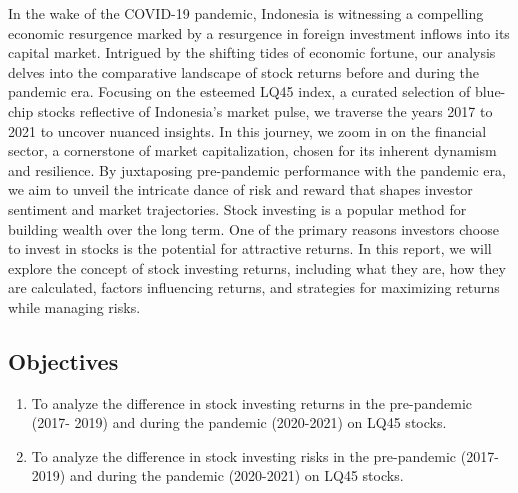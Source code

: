 \par

In the wake of the COVID-19 pandemic, Indonesia is witnessing a compelling economic resurgence marked by a resurgence in foreign investment inflows into its capital market.
Intrigued by the shifting tides of economic fortune, our analysis delves into the comparative landscape of stock returns before and during the pandemic era. Focusing on the esteemed LQ45 index, a curated selection of blue-chip stocks reflective of Indonesia's market pulse, we traverse the years 2017 to 2021 to uncover nuanced insights.
In this journey, we zoom in on the financial sector, a cornerstone of market capitalization, chosen for its inherent dynamism and resilience. By juxtaposing pre-pandemic performance with the pandemic era, we aim to unveil the intricate dance of risk and reward that shapes investor sentiment and market trajectories.
Stock investing is a popular method for building wealth over the long term. One of the primary reasons investors choose to invest in stocks is the potential for attractive returns. In this report, we will explore the concept of stock investing returns, including what they are, how they are calculated, factors influencing returns, and strategies for maximizing returns while managing risks.

\subsection{Objectives}
\begin{enumerate}
    \item To analyze the difference in stock investing returns in the pre-pandemic (2017-
2019) and during the pandemic (2020-2021) on LQ45 stocks.
    \item To analyze the difference in stock investing risks in the pre-pandemic (2017-
2019) and during the pandemic (2020-2021) on LQ45 stocks.
\end{enumerate}


